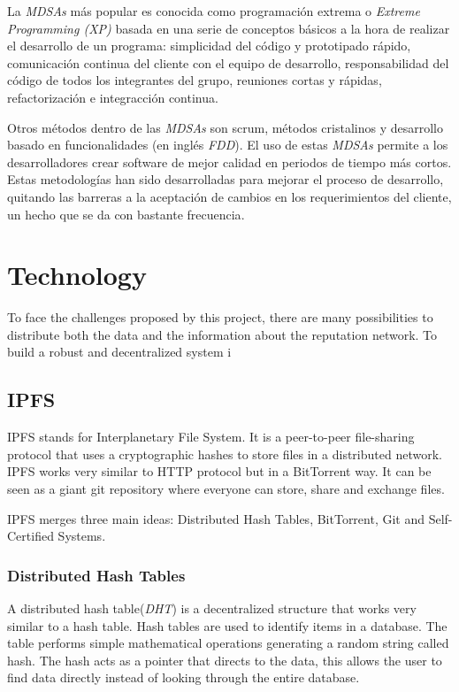 La \emph{MDSAs} más popular es conocida como programación extrema o
\emph{Extreme Programming (XP)}\cite{lindstrom2004extreme} basada en una serie
de conceptos básicos a la hora de realizar el desarrollo de un programa:
simplicidad del código y prototipado rápido, comunicación continua del cliente
con el equipo de desarrollo, responsabilidad del código de todos los integrantes
del grupo, reuniones cortas y rápidas, refactorización e integracción
continua.\cite{theunissen2005search,livermore2008factors}

Otros métodos dentro de las \emph{MDSAs} son scrum\cite{rising2000scrum},
métodos cristalinos\cite{cockburn2004crystal} y desarrollo basado en
funcionalidades (en inglés \emph{FDD})\cite{coad1999java}. El uso de estas
\emph{MDSAs} permite a los desarrolladores crear software de mejor calidad en
periodos de tiempo más cortos. Estas metodologías han sido desarrolladas para
mejorar el proceso de desarrollo, quitando las barreras a la aceptación de
cambios en los requerimientos del cliente, un hecho que se da con bastante
frecuencia\cite{lindstrom2004extreme}.

\section{Technology}

To face the challenges proposed by this project, there are many possibilities to
distribute both the data and the information about the reputation network. To
build a robust and decentralized system i

\subsection{IPFS}
\label{tech:sec:ipfs}
IPFS stands for Interplanetary File System. It is a peer-to-peer file-sharing
protocol that uses a cryptographic hashes to store files in a distributed
network. IPFS works very similar to HTTP protocol but in a BitTorrent way. It
can be seen as a giant git repository where everyone can store, share and
exchange files\cite{benet2014ipfs}.

IPFS merges three main ideas: Distributed Hash Tables, BitTorrent, Git and
Self-Certified Systems.

\subsubsection{Distributed Hash Tables}
A distributed hash table(\emph{DHT}) is a decentralized structure that works
very similar to a hash table. Hash tables are used to identify items in a
database. The table performs simple mathematical operations generating a random
string called hash. The hash acts as a pointer that directs to the data, this
allows the user to find data directly instead of looking through the entire
database\cite{kaluszka2010distributed}.

